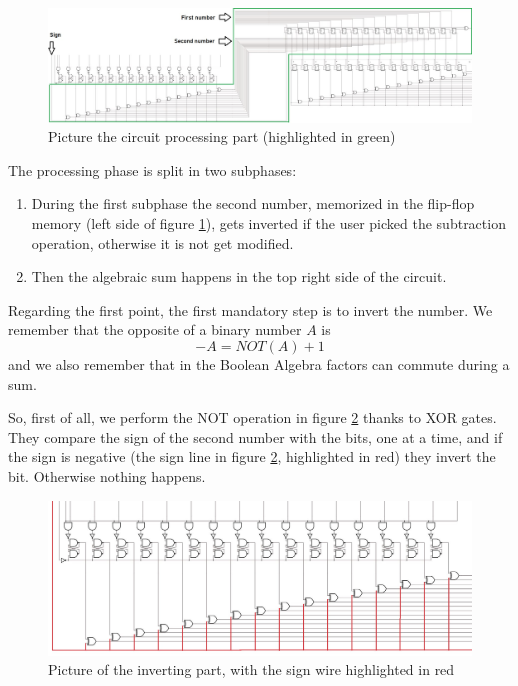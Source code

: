 \documentclass{article}
\begin{document}
\clearpage
\begin{figure}[h]
  \centering
  \includegraphics[scale=0.43]{SC_Processing_Total.JPG}
  \caption{Picture the circuit processing part (highlighted in green)}
  \label{Processing_Total}
\end{figure}

The processing phase is split in two subphases:
\begin{enumerate}
  \item During the first subphase the second number, memorized in the flip-flop memory (left side of figure \ref{Processing_Total}), gets inverted if the user picked the subtraction operation, otherwise it is not get modified.
  \item Then the algebraic sum happens in the top right side of the circuit.
\end{enumerate}

Regarding the first point, the first mandatory step is to invert the number. We remember that the opposite of a binary number $A$ is
\begin{equation}
-A=NOT(A)+1
\label{Law}
\end{equation}
and we also remember that in the Boolean Algebra factors can commute during a sum.

So, first of all, we perform the NOT operation in figure \ref{Processing1} thanks to XOR gates. They compare the sign of the second number with the bits, one at a time, and if the sign is negative (the sign line in figure \ref{Processing1}, highlighted in red) they invert the bit. Otherwise nothing happens.

\begin{figure}[h]
  \centering
  \includegraphics[scale=0.35]{SC_Processing1.JPG}
  \caption{Picture of the inverting part, with the sign wire highlighted in red}
  \label{Processing1}
\end{figure}
\end{document}
